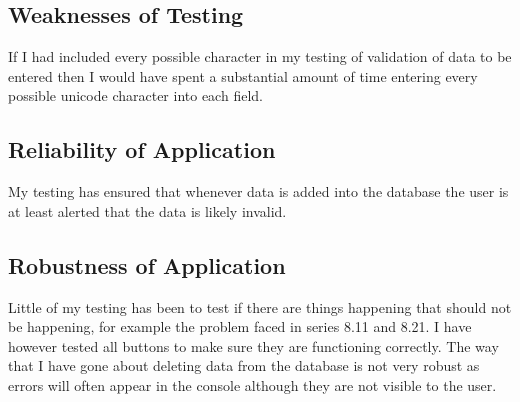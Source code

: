 \subsection{Weaknesses of Testing}
If I had included every possible character in my testing of validation of data to be entered then I would have spent a substantial amount of time entering every possible unicode character into each field.

\subsection{Reliability of Application}
My testing has ensured that whenever data is added into the database the user is at least alerted that the data is likely invalid. 

\subsection{Robustness of Application}
Little of my testing has been to test if there are things happening that should not be happening, for example the problem faced in series 8.11 and 8.21. I have however tested all buttons to make sure they are functioning correctly. The way that I have gone about deleting data from the database is not very robust as errors will often appear in the console although they are not visible to the user.

